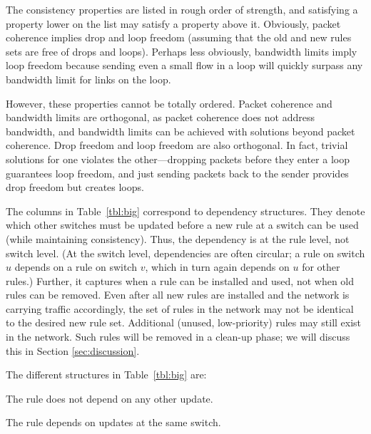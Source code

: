 The consistency properties are listed in rough order of strength, and satisfying a property lower on the list may satisfy a property above it. Obviously, packet coherence implies drop and loop freedom (assuming that the old and new rules sets are free of drops and loops). Perhaps less obviously, bandwidth limits imply loop freedom because sending even a small flow in a loop will quickly surpass any bandwidth limit for links on the loop.

However, these properties cannot be totally ordered. Packet coherence and bandwidth limits are orthogonal, as packet coherence does not address bandwidth, and bandwidth limits can be achieved with solutions beyond packet coherence.
Drop freedom and loop freedom are also orthogonal. In fact, trivial solutions for one violates the other---dropping packets before they enter a loop guarantees loop freedom, and just sending packets back to the sender provides drop freedom but creates loops.


The columns in Table~\ref{tbl:big} correspond to dependency structures. They denote which other switches must be updated before a new rule at a switch can be used (while maintaining consistency). Thus, the dependency is at the rule level, not switch level. (At the switch level, dependencies are often circular; a rule on switch $u$ depends on a rule on switch $v$, which in turn again depends on $u$ for other rules.)
Further, it captures when a rule can be installed and used, not when old rules can be removed. Even after all new rules are installed and the network is carrying traffic accordingly, the set of rules in the network may not be identical to the desired new rule set. Additional (unused, low-priority) rules may still exist in the network. Such rules will be removed in a clean-up phase;
we will discuss this in Section \ref{sec:discussion}.

The different structures in Table~\ref{tbl:big} are:

 The rule does not depend on any other update.

 The rule depends on updates at the same switch.

